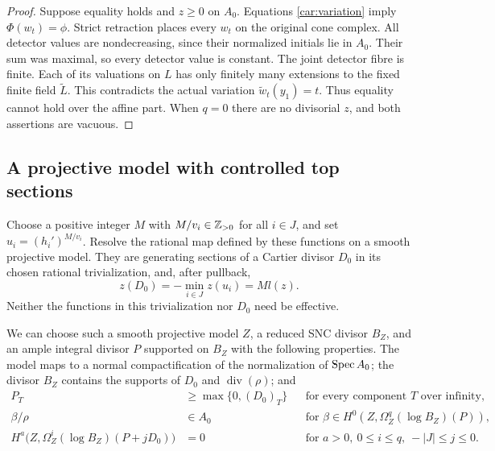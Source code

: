 \begin{proof}
Suppose equality holds and $z\ge0$ on $A_0$. Equations
\eqref{car:variation} imply $\Phi(w_t)=\phi$. Strict retraction
places every $w_t$ on the original cone complex. All detector
values are nondecreasing, since their normalized initials lie in
$A_0$. Their sum was maximal, so every detector value is constant.
The joint detector fibre is finite. Each of its valuations on $L$
has only finitely many extensions to the fixed finite field
$\widetilde L$. This contradicts the actual variation
$\widetilde w_t(y_1)=t$. Thus equality cannot hold over the affine
part. When $q=0$ there are no divisorial $z$, and both assertions
are vacuous.
\end{proof}

\subsection{A projective model with controlled top sections}

Choose a positive integer $M$ with $M/v_i\in\mathbb Z_{>0}$ for all
$i\in J$, and set $u_i=(h_i')^{M/v_i}$. Resolve the rational map
defined by these functions on a smooth projective model. They are
generating sections of a Cartier divisor $D_0$ in its chosen
rational trivialization, and, after pullback,
\begin{equation}\label{car:linear-system}
 z(D_0)=-\min_{i\in J}z(u_i)=M l(z).
\end{equation}
Neither the functions in this trivialization nor $D_0$ need be
effective.

We can choose such a smooth projective model $Z$, a reduced SNC
divisor $B_Z$, and an ample integral divisor $P$ supported on $B_Z$
with the following properties. The model maps to a normal
compactification of the normalization of $\operatorname{Spec} A_0$; the divisor
$B_Z$ contains the supports of $D_0$ and $\operatorname{div}(\rho)$;
and
\begin{align}
 P_T&\ge\max\{0,(D_0)_T\}
 &&\text{for every component }T\text{ over infinity},
 \label{car:infinity}\\
 \beta/\rho&\in A_0
 &&\text{for }\beta\in H^0(Z,\Omega_Z^q(\log B_Z)(P)),
 \label{car:top-sections}\\
 H^a\bigl(Z,\Omega_Z^i(\log B_Z)(P+jD_0)\bigr)&=0
 &&\text{for }a>0,\ 0\le i\le q,\ -|J|\le j\le0.
 \label{car:initial-vanishing}
\end{align}

